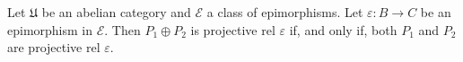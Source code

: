 Let $\mathfrak{U}$ be an abelian category and $\mathcal{E}$ a class of epimorphisms. Let $\varepsilon: B \to C$ be an epimorphism in $\mathcal{E}$. Then $P_1 \oplus P_2$ is projective rel $\varepsilon$ if, and only if, both $P_1$ and $P_2$ are projective rel $\varepsilon$.
